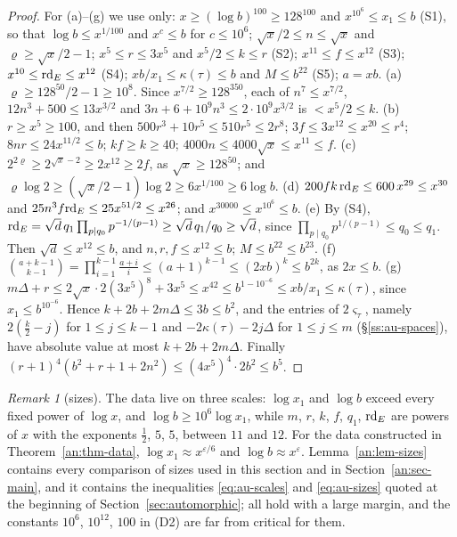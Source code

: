 \documentclass[10pt]{amsart}
\theoremstyle{definition}
\theoremstyle{remark}
\newtheorem{remark}[theorem]{Remark}
\begin{document}
\begin{proof}
For (a)--(g) we use only: $x\ge(\log b)^{100}\ge128^{100}$ and $x^{10^6}\le x_1\le b$ (S1), so that
$\log b\le x^{1/100}$ and $x^{c}\le b$ for $c\le10^{6}$; $\sqrt x/2\le n\le\sqrt x$ and $\varrho\ge\sqrt x/2-1$;
$x^{5}\le r\le3x^{5}$ and $x^{5}/2\le k\le r$ (S2); $x^{11}\le f\le x^{12}$ (S3); $x^{10}\le\mathrm{rd}_E\le x^{12}$ (S4);
$xb/x_1\le\kappa(\tau)\le b$ and $M\le b^{22}$ (S5); $a=xb$.
(a) $\varrho\ge128^{50}/2-1\ge10^{8}$. Since $x^{7/2}\ge128^{350}$, each of $n^{7}\le x^{7/2}$,
$12n^{3}+500\le13x^{3/2}$ and $3n+6+10^{9}n^{3}\le2\cdot10^{9}x^{3/2}$ is $<x^{5}/2\le k$.
(b) $r\ge x^{5}\ge100$, and then $500r^{3}+10r^{5}\le510r^{5}\le2r^{8}$; $3f\le3x^{12}\le x^{20}\le r^{4}$; $8nr\le24x^{11/2}\le b$; $kf\ge k\ge40$;
$4000n\le4000\sqrt x\le x^{11}\le f$.
(c) $2^{2\varrho}\ge2^{\sqrt x-2}\ge2x^{12}\ge2f$, as $\sqrt x\ge128^{50}$; and
$\varrho\log2\ge(\sqrt x/2-1)\log2\ge6x^{1/100}\ge6\log b$.
(d) $200fk\,\mathrm{rd}_E\le600\,x^{29}\le x^{30}$ and $25n^{3}f\mathrm{rd}_E\le25x^{51/2}\le x^{26}$; and
$x^{30000}\le x^{10^{6}}\le b$.
(e) By (S4), $\mathrm{rd}_E=\sqrt d\,q_1\prod_{p\mid q_0}p^{-1/(p-1)}\ge\sqrt d\,q_1/q_0\ge\sqrt d$, since
$\prod_{p\mid q_0}p^{1/(p-1)}\le q_0\le q_1$. Then $\sqrt d\le x^{12}\le b$, and $n,r,f\le x^{12}\le b$;
$M\le b^{22}\le b^{23}$.
(f) $\binom{a+k-1}{k-1}=\prod_{i=1}^{k-1}\frac{a+i}{i}\le(a+1)^{k-1}\le(2xb)^{k}\le b^{2k}$, as $2x\le b$.
(g) $m\Delta+r\le2\sqrt x\cdot2(3x^{5})^{8}+3x^{5}\le x^{42}\le b^{1-10^{-6}}\le xb/x_1\le\kappa(\tau)$, since
$x_1\le b^{10^{-6}}$. Hence $k+2b+2m\Delta\le3b\le b^{2}$, and the entries of $2\varsigma_\tau$, namely
$2(\frac k2-j)$ for $1\le j\le k-1$ and $-2\kappa(\tau)-2j\Delta$ for $1\le j\le m$
(\S\ref{ss:au-spaces}), have absolute value at most $k+2b+2m\Delta$. Finally
$(r+1)^{4}(b^{2}+r+1+2n^{2})\le(4x^{5})^{4}\cdot2b^{2}\le b^{5}$.
\end{proof}

\begin{remark}[sizes]\label{an:rem-sizes}
The data live on three scales: $\log x_1$ and $\log b$ exceed every fixed
power of $\log x$, and $\log b\ge10^{6}\log x_1$, while $m$, $r$, $k$, $f$,
$q_1$, $\mathrm{rd}_E$ are powers of $x$ with the exponents $\frac12$, $5$, $5$,
between $11$ and $12$. For the data constructed in
Theorem~\ref{an:thm-data}, $\log x_1\approx x^{\varepsilon/6}$ and
$\log b\approx x^{\varepsilon}$. Lemma~\ref{an:lem-sizes} contains every
comparison of sizes used in this section and in
Section~\ref{an:sec-main}, and it contains the inequalities
\eqref{eq:au-scales} and \eqref{eq:au-sizes} quoted at the beginning of
Section~\ref{sec:automorphic}; all hold with a large margin, and the
constants $10^{6}$, $10^{12}$, $100$ in (D2) are far from critical for them.
\end{remark}
\end{document}
